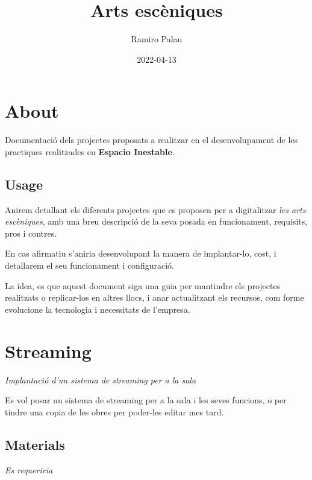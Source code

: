 \documentclass[
  10pt,
]{book}
\title{Arts escèniques}
\author{Ramiro Palau}
\date{2022-04-13}
\begin{document}
\maketitle

{
\setcounter{tocdepth}{2}
\tableofcontents
}
\hypertarget{about}{%
\chapter*{About}\label{about}}


Documentació dels projectes proposats a realitzar en el desenvolupament de les practiques realitzades en \textbf{Espacio Inestable}.

\hypertarget{usage}{%
\section*{Usage}\label{usage}}


Anirem detallant els diferents projectes que es proposen per a digitalitzar \emph{les arts escèniques}, amb una breu descripció de la seva posada en funcionament, requisits, pros i contres.

En cas afirmatiu s'aniria desenvolupant la manera de implantar-lo, cost, i detallarem el seu funcionament i configuració.

La idea, es que aquest document siga una guia per mantindre els projectes realitzats o replicar-los en altres llocs, i anar actualitzant els recursos, com forme evolucione la tecnologia i necessitats de l'empresa.

\hypertarget{streaming}{%
\chapter{Streaming}\label{streaming}}

\emph{Implantació d'un sistema de streaming per a la sala}

Es vol posar un sistema de streaming per a la sala i les seves funcions, o per tindre una copia de les obres per poder-les editar mes tard.

\hypertarget{materials}{%
\section{Materials}\label{materials}}

\emph{Es requeriria}
\end{document}
